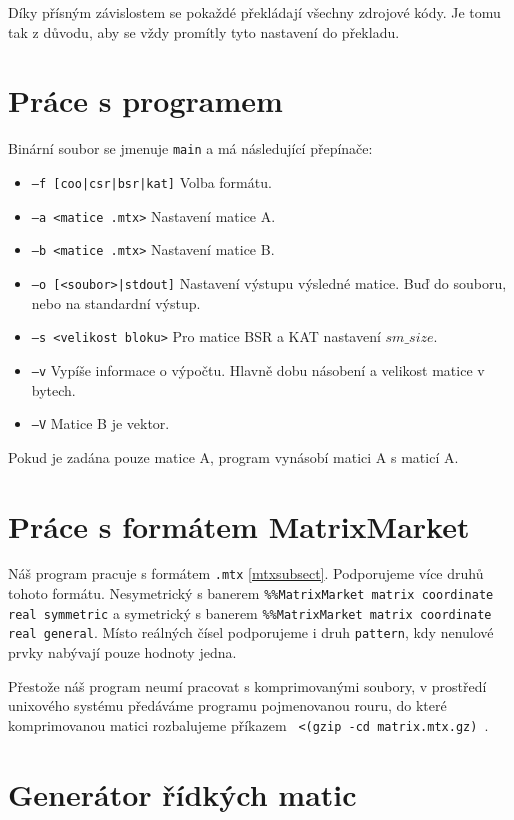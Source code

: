 \documentclass[thesis=B,czech]{FITthesis}[2012/06/26]
\begin{document}
Díky přísným závislostem se pokaždé překládají všechny zdrojové kódy. Je tomu tak z důvodu, aby se vždy promítly tyto nastavení do překladu.

\section{Práce s programem}

Binární soubor se jmenuje \texttt{main} a má následující přepínače:

\begin{itemize}
	\item \texttt{--f [coo|csr|bsr|kat]} Volba formátu.
	\item \texttt{--a <matice .mtx>} Nastavení matice A.
	\item \texttt{--b <matice .mtx>} Nastavení matice B.
	\item \texttt{--o [<soubor>|stdout]} Nastavení výstupu výsledné matice. Buď do souboru, nebo na standardní výstup.
	\item \texttt{--s <velikost bloku>} Pro matice BSR a KAT nastavení $sm\_size$.
	\item \texttt{--v} Vypíše informace o výpočtu. Hlavně dobu násobení a velikost matice v bytech.
	\item \texttt{--V} Matice B je vektor.
\end{itemize}

Pokud je zadána pouze matice A, program vynásobí matici A s maticí A.

\section{Práce s formátem MatrixMarket}
\label{MM}

Náš program pracuje s formátem \texttt{.mtx} \ref{mtxsubsect}. Podporujeme více druhů tohoto formátu. Nesymetrický s banerem \texttt{\%\%MatrixMarket matrix coordinate real symmetric} a symetrický s banerem \texttt{\%\%MatrixMarket matrix coordinate real general}. Místo reálných čísel podporujeme i druh \texttt{pattern}, kdy nenulové prvky nabývají pouze hodnoty jedna.

Přestože náš program neumí pracovat s komprimovanými soubory, v prostředí unixového systému předáváme programu pojmenovanou rouru, do které komprimovanou matici rozbalujeme příkazem \texttt{ <(gzip -cd matrix.mtx.gz) }.

\section{Generátor řídkých matic}
\end{document}
